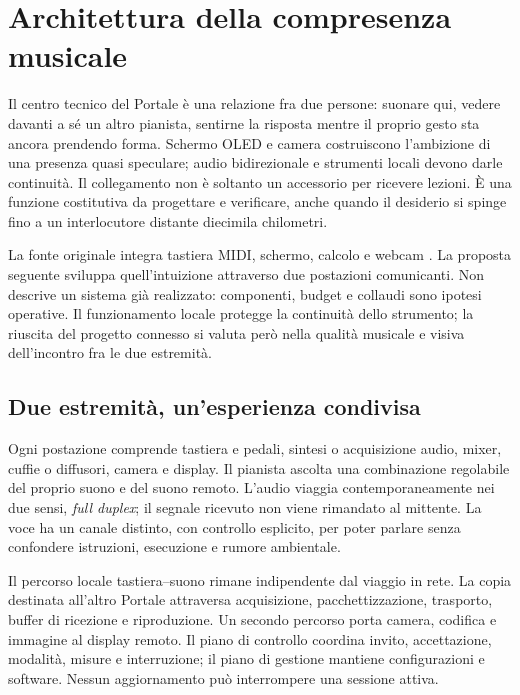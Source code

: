 \chapter{Architettura della compresenza musicale}\label{sec:engineering}

Il centro tecnico del Portale è una relazione fra due persone: suonare
qui, vedere davanti a sé un altro pianista, sentirne la risposta mentre
il proprio gesto sta ancora prendendo forma. Schermo OLED e camera
costruiscono l'ambizione di una presenza quasi speculare; audio
bidirezionale e strumenti locali devono darle continuità. Il collegamento
non è soltanto un accessorio per ricevere lezioni. È una funzione
costitutiva da progettare e verificare, anche quando il desiderio si
spinge fino a un interlocutore distante diecimila chilometri.

La fonte originale integra tastiera MIDI, schermo, calcolo e webcam
\cite[pp.~2--3]{terzi_peeragogy_2016}. La proposta seguente sviluppa
quell'intuizione attraverso due postazioni comunicanti. Non descrive
un sistema già realizzato: componenti, budget e collaudi sono ipotesi
operative. Il funzionamento locale protegge la continuità dello
strumento; la riuscita del progetto connesso si valuta però nella
qualità musicale e visiva dell'incontro fra le due estremità.

\section{Due estremità, un'esperienza condivisa}

Ogni postazione comprende tastiera e pedali, sintesi o acquisizione
audio, mixer, cuffie o diffusori, camera e display. Il pianista ascolta
una combinazione regolabile del proprio suono e del suono remoto.
L'audio viaggia contemporaneamente nei due sensi, \emph{full duplex};
il segnale ricevuto non viene rimandato al mittente. La voce ha un
canale distinto, con controllo esplicito, per poter parlare senza
confondere istruzioni, esecuzione e rumore ambientale.

Il percorso locale tastiera--suono rimane indipendente dal viaggio
in rete. La copia destinata all'altro Portale attraversa acquisizione,
pacchettizzazione, trasporto, buffer di ricezione e riproduzione. Un
secondo percorso porta camera, codifica e immagine al display remoto.
Il piano di controllo coordina invito, accettazione, modalità,
misure e interruzione; il piano di gestione mantiene configurazioni
e software. Nessun aggiornamento può interrompere una sessione attiva.

